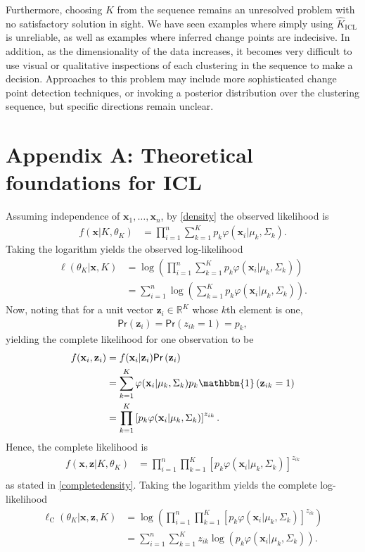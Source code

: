\documentclass{uwstat572}
\newcommand*\reals{\mathbb{R}}
\newcommand*\ba{\[ \begin{aligned}}
\newcommand*\ea{\end{aligned} \]}
\newcommand*\ind[1]{\mathbbm{1}\left(#1\right)}
\newcommand*\estim[1]{\widehat{#1}}
\newcommand*\bx{\mathbf{x}}
\newcommand*\bz{\mathbf{z}}
\renewcommand\;{\,}
\renewcommand\phi{\varphi}
\renewcommand\Pr[1]{ \mathsf{Pr}\left(#1\right) }
\begin{document}
Furthermore, choosing $K$ from the sequence remains an unresolved problem with no satisfactory solution in sight.
We have seen examples where simply using $\estim K_\text{ICL}$ is unreliable, as well as examples where inferred change points are indecisive.
In addition, as the dimensionality of the data increases, it becomes very difficult to use visual or qualitative inspections of each clustering in the sequence to make a decision.
Approaches to this problem may include more sophisticated change point detection techniques, or invoking a posterior distribution over the clustering sequence, but specific directions remain unclear.

 



\section*{Appendix A: Theoretical foundations for ICL}
Assuming independence of $\bx_1, \dotsc, \bx_n$, by \eqref{density} the observed likelihood is
\ba
f(\bx | K, \theta_K)
	& = \prod_{i=1}^n \sum_{k=1}^K p_k \phi(\bx_i | \mu_k, \Sigma_k).
\ea
Taking the logarithm yields the observed log-likelihood
\begin{equation}\label{l}
\begin{split}
\ell(\theta_K | \bx, K)
	& = \log\left( \prod_{i=1}^n \sum_{k=1}^K p_k \phi(\bx_i | \mu_k, \Sigma_k) \right) \\
	& = \sum_{i=1}^n \log \left( \sum_{k=1}^K p_k \phi(\bx_i | \mu_k, \Sigma_k) \right).
\end{split}
\end{equation}
Now, noting that for a unit vector $\bz_i \in \reals^K$ whose $k$th element is one, 
\ba
\Pr{\bz_i} = \Pr{z_{ik} = 1} = p_k,
\ea
yielding the complete likelihood for one observation to be
\ba
f(\bx_i, \bz_i)
	& = f(\bx_i | \bz_i) \Pr{\bz_i} \\
	& = \sum_{k=1}^K \phi(\bx_i | \mu_k, \Sigma_k) p_k \ind{\bz_{ik} = 1}
		 \\
	& = \prod_{k = 1}^K 
		\left[ p_k \phi(\bx_i | \mu_k, \Sigma_k) \right]^{z_{ik}}.
\ea
Hence, the complete likelihood is
\ba
f(\bx, \bz| K, \theta_K)
	& = \prod_{i=1}^n \prod_{k = 1}^K 
		\left[ p_k \phi(\bx_i | \mu_k, \Sigma_k) \right]^{z_{ik}} \\
\ea
as stated in \eqref{completedensity}.
Taking the logarithm yields the complete log-likelihood
\begin{equation}\label{lc}
\begin{split}
\ell_\text{C}(\theta_K | \bx, \bz, K)
	& = \log\left(\prod_{i=1}^n \prod_{k = 1}^K 
		\left[ p_k \phi(\bx_i | \mu_k, \Sigma_k) \right]^{z_{ik}} \right)\\
	& = \sum_{i=1}^n \sum_{k=1}^K z_{ik} \log \left( p_k \phi(\bx_i | \mu_k, \Sigma_k) \right).
\end{split}
\end{equation}
\end{document}
